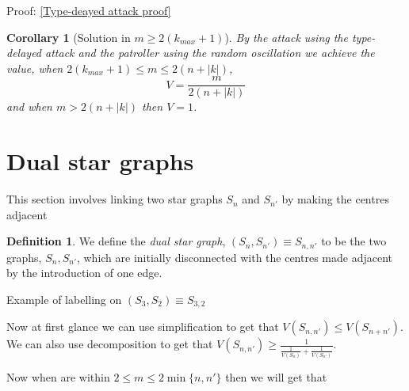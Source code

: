 \documentclass[a4paper,10pt]{article}
\newtheorem{corollary}[theorem]{Corollary}
\theoremstyle{definition}
\newtheorem{definition}[theorem]{Definition}
\theoremstyle{definition}
\theoremstyle{remark}
\theoremstyle{definition}
\begin{document}
Proof: \ref{Type-deayed attack proof}


\begin{corollary}[Solution in $m \geq 2(k_{max}+1)$]
By the attack using the type-delayed attack and the patroller using the random oscillation we achieve the value, when $2(k_{max}+1) \leq m \leq 2(n+|k|)$,
$$V= \frac{m}{2(n+|k|)} $$
and when $m > 2(n+|k|)$ then $V=1$.
\end{corollary}

\section{Dual star graphs}
This section involves linking two star graphs $S_{n}$ and $S_{n'}$ by making the centres adjacent

\begin{definition}
We define the \textit{dual star graph}, $(S_{n},S_{n'}) \equiv S_{n,n'}$ to be the two graphs, $S_{n},S_{n'}$, which are initially disconnected with the centres made adjacent by the introduction of one edge.
\end{definition}

\begin{myfigure}
\caption{Example of labelling on $(S_{3},S_{2}) \equiv S_{3,2}$}
\label{myfigure: Example of labeling on dual star graph}
\end{myfigure}

Now at first glance we can use simplification to get that $V(S_{n,n'}) \leq V(S_{n+n'})$. We can also use decomposition to get that $V(S_{n,n'}) \geq  \frac{1}{\frac{1}{V(S_{n})}+\frac{1}{V(S_{n'})}}$.

Now when are within $2 \leq m \leq 2\min\{n,n' \}$ then we will get that
\end{document}
